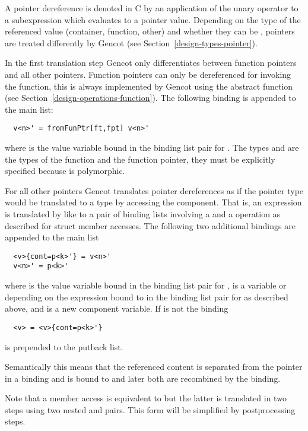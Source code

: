 A pointer dereference is denoted in C by an application of the unary operator \code{*} to a subexpression  which evaluates to
a pointer value. Depending on the type of the referenced value (container, function, other) and whether they can be ,
pointers are treated differently by Gencot (see Section~\ref{design-types-pointer}).

In the first translation step Gencot only differentiates between function pointers and all other pointers. Function pointers
can only be dereferenced for invoking the function, this is always implemented by Gencot using the abstract function
 (see Section~\ref{design-operations-function}). The following binding is appended to the main list:
\begin{verbatim}
  v<n>' = fromFunPtr[ft,fpt] v<n>'
\end{verbatim}
where  is the value variable bound in the binding list pair for . The types  and  are
the types of the function and the function pointer, they must be explicitly specified because  is polymorphic.

For all other pointers Gencot translates pointer dereferences as if the
pointer type would be translated to a type  by accessing the  component. That is, an expression
 is translated by  like  to a pair of binding lists involving a  and a 
operation as described for struct member accesses. The following two additional bindings are appended to the main list
\begin{verbatim}
  <v>{cont=p<k>'} = v<n>'
  v<n>' = p<k>'
\end{verbatim}
where  is the value variable bound in the binding list pair for ,  is a variable or \code{\_}
depending on the expression bound to  in the binding list pair for  as described above, and 
is a new component variable. If  is not \code{\_} the binding
\begin{verbatim}
  <v> = <v>{cont=p<k>'}
\end{verbatim}
is prepended to the putback list.

Semantically this means that the referenced content is separated from the pointer in a  binding and is bound
to  and later both are recombined by the  binding.

Note that a member access  is equivalent to  but the latter is translated in two steps using two
nested  and  pairs. This form will be simplified by postprocessing steps.

